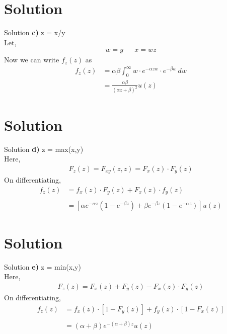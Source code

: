 \documentclass{beamer}
\begin{document}
\section{Solution}
\begin{frame}{Solution}
\textbf{c)} z = x/y\\
Let,
\begin{align*}
    w = y && x = wz
\end{align*}
Now we can write $f_z(z)$ as 
\begin{align*}
    f_z(z) &= \alpha \beta \int_{0}^{\infty} w \cdot e^{-\alpha zw} \cdot e^{-\beta w} \, dw \\
           &= \frac{\alpha \beta}{(\alpha z + \beta)^2} u(z)
\end{align*}
\end{frame}

\section{Solution}
\begin{frame}{Solution}
\textbf{d)} z = max(x,y)\\
Here,
\begin{align}
    F_z(z) = F_{xy}(z,z) = F_x(z) \cdot F_y(z)
\end{align}
On differentiating,
\begin{align*}
    f_z(z) &= f_x(z) \cdot F_y(z) + F_x(z) \cdot f_y(z)\\\\
           &= [\alpha e^{-\alpha z}(1 - e^{-\beta z}) + \beta e^{-\beta z}(1 - e^{-\alpha z})] u(z)
\end{align*}
\end{frame}

\section{Solution}
\begin{frame}{Solution}
\textbf{e)} z = min(x,y)\\
Here,
\begin{align}
    F_z(z) = F_{x}(z) + F_{y}(z) - F_{x}(z) \cdot F_{y}(z)
\end{align}
On differentiating,
\begin{align*}
    f_z(z) &= f_x(z) \cdot [1 - F_y(z)] + f_y(z) \cdot [1 - F_x(z)]\\\\
           &= (\alpha + \beta) e^{-(\alpha + \beta)z}u(z)
\end{align*}
\end{frame}
\end{document}
